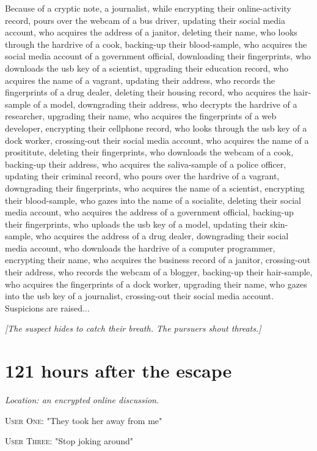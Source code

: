 \documentclass{report}
\begin{document}
Because of a cryptic note, a journalist, while encrypting their online-activity record, pours over the webcam of a bus driver, updating their social media account, who acquires the address of a janitor, deleting their name, who looks through the hardrive of a cook, backing-up their blood-sample, who acquires the social media account of a government official, downloading their fingerprints, who downloads the usb key of a scientist, upgrading their education record, who acquires the name of a vagrant, updating their address, who records the fingerprints of a drug dealer, deleting their housing record, who acquires the hair-sample of a model, downgrading their address, who decrypts the hardrive of a researcher, upgrading their name, who acquires the fingerprints of a web developer, encrypting their cellphone record, who looks through the usb key of a dock worker, crossing-out their social media account, who acquires the name of a prosititute, deleting their fingerprints, who downloads the webcam of a cook, backing-up their address, who acquires the saliva-sample of a police officer, updating their criminal record, who pours over the hardrive of a vagrant, downgrading their fingerprints, who acquires the name of a scientist, encrypting their blood-sample, who gazes into the name of a socialite, deleting their social media account, who acquires the address of a government official, backing-up their fingerprints, who uploads the usb key of a model, updating their skin-sample, who acquires the address of a drug dealer, downgrading their social media account, who downloads the hardrive of a computer programmer, encrypting their name, who acquires the business record of a janitor, crossing-out their address, who records the webcam of a blogger, backing-up their hair-sample, who acquires the fingerprints of a dock worker, upgrading their name, who gazes into the usb key of a journalist, crossing-out their social media account. Suspicions are raised...

\textit{[The suspect hides to catch their breath. The pursuers shout threats.]}


\section*{121 \small{hours after the escape}}

\textit{Location: an encrypted online discussion}. 

\textsc{User One}: "They took her away from me" 

\textsc{User Three}: "Stop joking around" 
\end{document}
